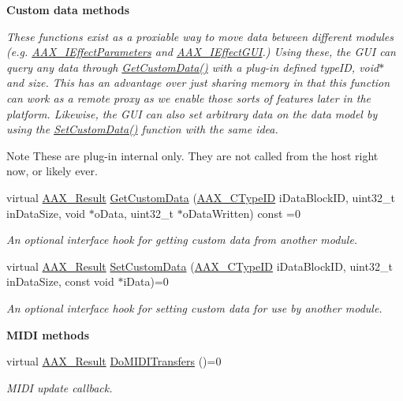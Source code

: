 \begin{Indent}{\bf Custom data methods}\par
{\em These functions exist as a proxiable way to move data between different modules (e.\+g. \hyperlink{a00099}{A\+A\+X\+\_\+\+I\+Effect\+Parameters} and \hyperlink{a00098}{A\+A\+X\+\_\+\+I\+Effect\+G\+U\+I}.) Using these, the G\+U\+I can query any data through \hyperlink{a00061_a4728fcad006d921a07489144360f447e}{Get\+Custom\+Data()} with a plug-\/in defined {\ttfamily type\+I\+D}, {\ttfamily void$\ast$} and size. This has an advantage over just sharing memory in that this function can work as a remote proxy as we enable those sorts of features later in the platform. Likewise, the G\+U\+I can also set arbitrary data on the data model by using the \hyperlink{a00061_aa838cad04781853ef2e0b9df22a05170}{Set\+Custom\+Data()} function with the same idea.

\begin{DoxyNote}{Note}
These are plug-\/in internal only. They are not called from the host right now, or likely ever. 
\end{DoxyNote}
}\begin{DoxyCompactItemize}
\item 
virtual \hyperlink{a00149_a4d8f69a697df7f70c3a8e9b8ee130d2f}{A\+A\+X\+\_\+\+Result} \hyperlink{a00061_a4728fcad006d921a07489144360f447e}{Get\+Custom\+Data} (\hyperlink{a00149_ac678f9c1fbcc26315d209f71a147a175}{A\+A\+X\+\_\+\+C\+Type\+I\+D} i\+Data\+Block\+I\+D, uint32\+\_\+t in\+Data\+Size, void $\ast$o\+Data, uint32\+\_\+t $\ast$o\+Data\+Written) const =0
\begin{DoxyCompactList}\small\item\em An optional interface hook for getting custom data from another module. \end{DoxyCompactList}\item 
virtual \hyperlink{a00149_a4d8f69a697df7f70c3a8e9b8ee130d2f}{A\+A\+X\+\_\+\+Result} \hyperlink{a00061_aa838cad04781853ef2e0b9df22a05170}{Set\+Custom\+Data} (\hyperlink{a00149_ac678f9c1fbcc26315d209f71a147a175}{A\+A\+X\+\_\+\+C\+Type\+I\+D} i\+Data\+Block\+I\+D, uint32\+\_\+t in\+Data\+Size, const void $\ast$i\+Data)=0
\begin{DoxyCompactList}\small\item\em An optional interface hook for setting custom data for use by another module. \end{DoxyCompactList}\end{DoxyCompactItemize}
\end{Indent}
\begin{Indent}{\bf M\+I\+D\+I methods}\par
\begin{DoxyCompactItemize}
\item 
virtual \hyperlink{a00149_a4d8f69a697df7f70c3a8e9b8ee130d2f}{A\+A\+X\+\_\+\+Result} \hyperlink{a00061_af376aef3d3ecdc6287f820b4e01f5c9b}{Do\+M\+I\+D\+I\+Transfers} ()=0
\begin{DoxyCompactList}\small\item\em M\+I\+D\+I update callback. \end{DoxyCompactList}\end{DoxyCompactItemize}
\end{Indent}


